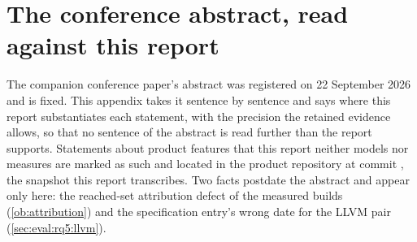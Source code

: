 \section{The conference abstract, read against this report}
\label{appendix:abstract}

The companion conference paper's abstract was registered on 22 September
2026 and is fixed. This appendix takes it sentence by sentence and says where
this report substantiates each statement, with the precision the retained
evidence allows, so that no sentence of the abstract is read further than the
report supports. Statements about product features that this report neither
models nor measures are marked as such and located in the product repository
at commit , the snapshot this report transcribes. Two facts
postdate the abstract and appear only here: the reached-set attribution
defect of the measured builds (\cref{ob:attribution}) and the specification
entry's wrong date for the LLVM pair (\cref{sec:eval:rq5:llvm}).

